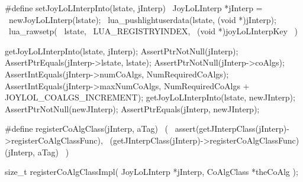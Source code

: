 \startCHeader
#define setJoyLoLInterpInto(lstate, jInterp)      \
  JoyLoLInterp *jInterp =                         \
    newJoyLoLInterp(lstate);                      \
  lua_pushlightuserdata(lstate, (void *)jInterp); \
  lua_rawsetp(                                    \
    lstate,                                       \
    LUA_REGISTRYINDEX,                            \
    (void *)joyLoLInterpKey                       \
  )
\stopCHeader
\setCHeaderStream{public}


\startCTest
  getJoyLoLInterpInto(lstate, jInterp);
  AssertPtrNotNull(jInterp);
  AssertPtrEquals(jInterp->lstate, lstate);
  AssertPtrNotNull(jInterp->coAlgs);
  AssertIntEquals(jInterp->numCoAlgs, NumRequiredCoAlgs);
  AssertIntEquals(jInterp->maxNumCoAlgs,
    NumRequiredCoAlgs + JOYLOL_COALGS_INCREMENT);
  getJoyLoLInterpInto(lstate, newJInterp);
  AssertPtrNotNull(newJInterp);
  AssertPtrEquals(jInterp, newJInterp);
\stopCTest
\stopTestCase
\stopTestSuite

\startTestSuite[registerCoAlgebra]

\startCHeader
#define registerCoAlgClass(jInterp, aTag)                              \
  (                                                                    \
    assert(getJInterpClass(jInterp)->registerCoAlgClassFunc),          \
    (getJInterpClass(jInterp)->registerCoAlgClassFunc)(jInterp, aTag)  \
  )
\stopCHeader

\startCHeader
size_t registerCoAlgClassImpl(
  JoyLoLInterp *jInterp,
  CoAlgClass *theCoAlg
);
\stopCHeader
\setCHeaderStream{public}

